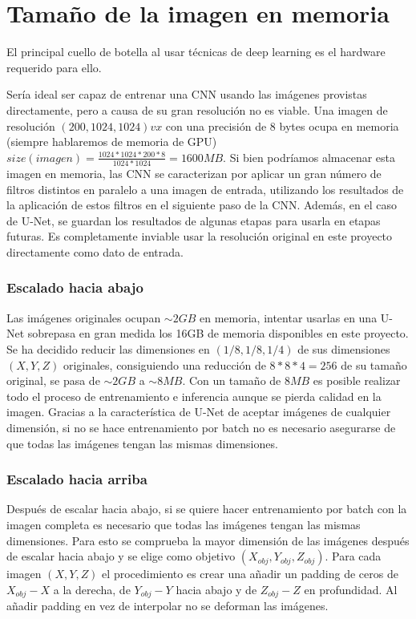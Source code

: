 \section{Tamaño de la imagen en memoria}\label{sec:size_problem}

El principal cuello de botella al usar técnicas de deep learning es el hardware requerido para ello. 

Sería ideal ser capaz de entrenar una CNN usando las imágenes provistas directamente, pero a causa de su gran resolución no es viable. Una imagen de resolución $ (200, 1024, 1024)vx $ con una precisión de 8 bytes ocupa en memoria (siempre hablaremos de memoria de GPU) $size(imagen)=\frac{1024*1024*200*8}{1024*1024}=1600MB $. Si bien podríamos almacenar esta imagen en memoria, las CNN se caracterizan por aplicar un gran número de filtros distintos en paralelo a una imagen de entrada, utilizando los resultados de la aplicación de estos filtros en el siguiente paso de la CNN. Además, en el caso de U-Net, se guardan los resultados de algunas etapas para usarla en etapas futuras. Es completamente inviable usar la resolución original en este proyecto directamente como dato de entrada.

\subsubsection{Escalado hacia abajo}\label{subsubsec:downscale}

Las imágenes originales ocupan $\sim 2GB$ en memoria, intentar usarlas en una U-Net sobrepasa en gran medida los 16GB de memoria disponibles en este proyecto. Se ha decidido reducir las dimensiones en $(1/8, 1/8, 1/4)$ de sus dimensiones $(X, Y, Z)$ originales, consiguiendo una reducción de $8*8*4=256$ de su tamaño original, se pasa de $\sim 2GB$ a $\sim 8MB$. Con un tamaño de $8MB$ es posible realizar todo el proceso de entrenamiento e inferencia aunque se pierda calidad en la imagen. Gracias a la característica de U-Net de aceptar imágenes de cualquier dimensión, si no se hace entrenamiento por batch no es necesario asegurarse de que todas las imágenes tengan las mismas dimensiones.

\subsubsection{Escalado hacia arriba}\label{subsubsec:upscale}

Después de escalar hacia abajo, si se quiere hacer entrenamiento por batch con la imagen completa es necesario que todas las imágenes tengan las mismas dimensiones. Para esto se comprueba la mayor dimensión de las imágenes después de escalar hacia abajo y se elige como objetivo $(X_{obj}, Y_{obj}, Z_{obj})$. Para cada imagen $(X, Y, Z)$ el procedimiento es crear una añadir un padding de ceros de $X_{obj}-X$ a la derecha, de $Y_{obj}-Y$ hacia abajo y de $Z_{obj}-Z$ en profundidad. Al añadir padding en vez de interpolar no se deforman las imágenes.

